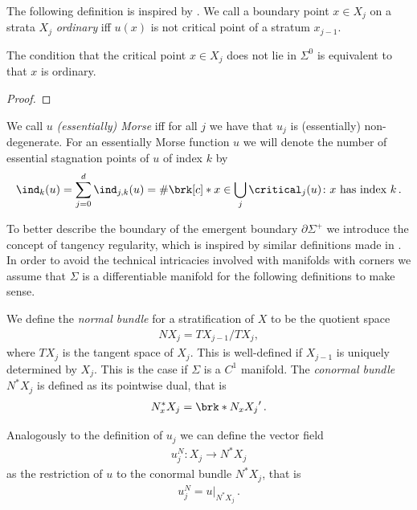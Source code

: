The following definition is inspired by \cite{Morse1970}.
We call a boundary point $x\in X_j$ on a strata $X_j$ \emph{ordinary} iff $u(x)$ is not 
critical point of a stratum $x_{j-1}$.
\begin{proposition}
  The condition that the critical point $x\in X_j$ does not lie in $\Sigma^0$ is equivalent to that
  $x$ is ordinary.
\end{proposition}
\begin{proof}
\end{proof}

\begin{definition}
  We call $u$ \emph{(essentially) Morse} iff for all $j$ we have that $u_j$ is (essentially) non-degenerate.
  For an essentially Morse function $u$ we will denote the number of
  essential stagnation points of $u$ of index $k$ by
  \begin{align*}
    \ind_k(u)=\sum_{j=0}^d\ind_{j,k}(u)=\#\brk[c]*{x\in\bigcup_j\critical_j(u)\colon x\text{ has index }k}\,.
  \end{align*}
\end{definition}

To better describe the boundary of the emergent boundary $\partial\Sigma^+$ we introduce the
concept of tangency regularity, which is inspired by similar definitions made in \cite{Katz2014}.
In order to avoid the technical intricacies involved with manifolds with corners we assume that
$\Sigma$ is a differentiable manifold for the following definitions to make sense.
\begin{definition}
  We define the \emph{normal bundle} for a stratification of $X$ to be the quotient space
  \begin{align}
    NX_j=TX_{j-1}/TX_j,
  \end{align}
  where $TX_j$ is the tangent space of $X_j$. This is well-defined if $X_{j-1}$ is uniquely determined
  by $X_j$. This is the case if $\Sigma$ is a $C^1$ manifold.
  The \emph{conormal bundle} $N^*X_j$ is defined as its pointwise dual, that is
  \begin{align*}
    N_x^*X_j=\brk*{N_xX_j}'\,.
  \end{align*}
\end{definition}

Analogously to the definition of $u_j$ we can define the vector field
\begin{align*}
  u_j^N\colon X_j\to N^*X_j
\end{align*}
as the restriction of $u$ to the conormal bundle $N^*X_j$, that is
\begin{align}
  u_j^N=u\big\vert_{N^*X_j}\,.\label{eq:def_projectionUNStratification}
\end{align}

